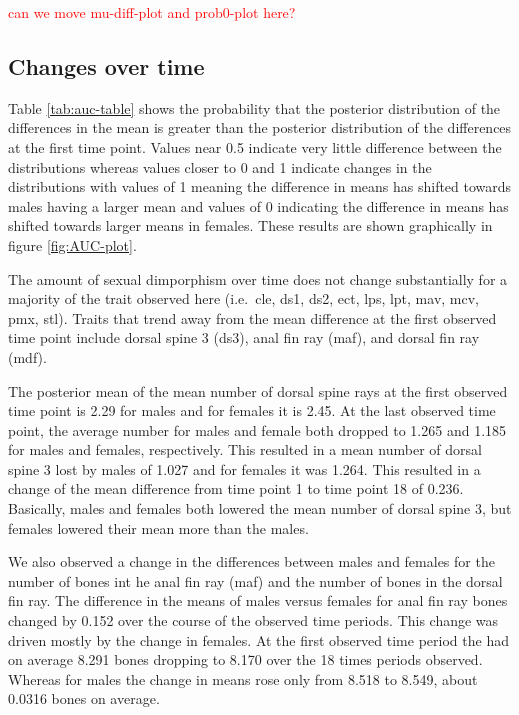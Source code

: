 \documentclass[
  12pt,
]{article}
\begin{document}
\textcolor{red}{can we move mu-diff-plot and prob0-plot here?}

\hypertarget{changes-over-time}{%
\subsection{Changes over time}\label{changes-over-time}}

Table \ref{tab:auc-table} shows the probability that the posterior
distribution of the differences in the mean is greater than the
posterior distribution of the differences at the first time point.
Values near 0.5 indicate very little difference between the
distributions whereas values closer to 0 and 1 indicate changes in the
distributions with values of 1 meaning the difference in means has
shifted towards males having a larger mean and values of 0 indicating
the difference in means has shifted towards larger means in females.
These results are shown graphically in figure \ref{fig:AUC-plot}.

The amount of sexual dimporphism over time does not change substantially
for a majority of the trait observed here (i.e.~cle, ds1, ds2, ect, lps,
lpt, mav, mcv, pmx, stl). Traits that trend away from the mean
difference at the first observed time point include dorsal spine 3
(ds3), anal fin ray (maf), and dorsal fin ray (mdf).

The posterior mean of the mean number of dorsal spine rays at the first
observed time point is 2.29 for males and for females it is 2.45. At the
last observed time point, the average number for males and female both
dropped to 1.265 and 1.185 for males and females, respectively. This
resulted in a mean number of dorsal spine 3 lost by males of 1.027 and
for females it was 1.264. This resulted in a change of the mean
difference from time point 1 to time point 18 of 0.236. Basically, males
and females both lowered the mean number of dorsal spine 3, but females
lowered their mean more than the males.

We also observed a change in the differences between males and females
for the number of bones int he anal fin ray (maf) and the number of
bones in the dorsal fin ray. The difference in the means of males versus
females for anal fin ray bones changed by 0.152 over the course of the
observed time periods. This change was driven mostly by the change in
females. At the first observed time period the had on average 8.291
bones dropping to 8.170 over the 18 times periods observed. Whereas for
males the change in means rose only from 8.518 to 8.549, about 0.0316
bones on average.
\end{document}
